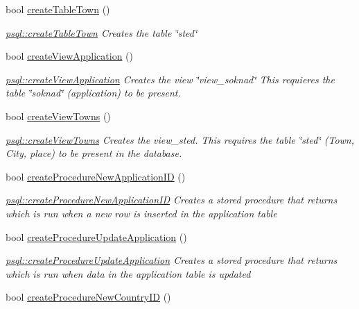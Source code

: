 \begin{DoxyCompactItemize}
bool \hyperlink{classpsql_a95d1f522766174bd2c6a7b94f725719c}{create\+Table\+Town} ()
\begin{DoxyCompactList}\small\item\em \hyperlink{classpsql_a95d1f522766174bd2c6a7b94f725719c}{psql\+::create\+Table\+Town} Creates the table \char`\"{}sted\char`\"{} \end{DoxyCompactList}\item 
bool \hyperlink{classpsql_ad6fb8e1e7177c7996f297d477ecceb27}{create\+View\+Application} ()
\begin{DoxyCompactList}\small\item\em \hyperlink{classpsql_ad6fb8e1e7177c7996f297d477ecceb27}{psql\+::create\+View\+Application} Creates the view \char`\"{}view\+\_\+soknad\char`\"{} This requieres the table \char`\"{}soknad\char`\"{} (application) to be present. \end{DoxyCompactList}\item 
bool \hyperlink{classpsql_ac5b1230ac405a600b67b144060b33a0d}{create\+View\+Towns} ()
\begin{DoxyCompactList}\small\item\em \hyperlink{classpsql_ac5b1230ac405a600b67b144060b33a0d}{psql\+::create\+View\+Towns} Creates the view\+\_\+sted. This requires the table \char`\"{}sted\char`\"{} (Town, City, place) to be present in the database. \end{DoxyCompactList}\item 
bool \hyperlink{classpsql_ae9e3ee06f4a5ecd4178662dfa0655fe1}{create\+Procedure\+New\+Application\+ID} ()
\begin{DoxyCompactList}\small\item\em \hyperlink{classpsql_ae9e3ee06f4a5ecd4178662dfa0655fe1}{psql\+::create\+Procedure\+New\+Application\+ID} Creates a stored procedure that returns which is run when a new row is inserted in the application table \end{DoxyCompactList}\item 
bool \hyperlink{classpsql_a28f3e3d6309e3ce57493db284c099946}{create\+Procedure\+Update\+Application} ()
\begin{DoxyCompactList}\small\item\em \hyperlink{classpsql_a28f3e3d6309e3ce57493db284c099946}{psql\+::create\+Procedure\+Update\+Application} Creates a stored procedure that returns which is run when data in the application table is updated \end{DoxyCompactList}\item 
bool \hyperlink{classpsql_a565bfc828ecb6b5621354128773494fd}{create\+Procedure\+New\+Country\+ID} ()

\end{DoxyCompactItemize}
